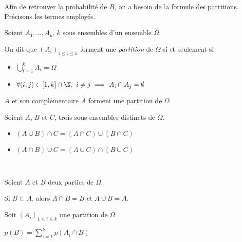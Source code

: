 \documentclass[12pt,a4paper,frenchb]{article}
\begin{document}
Afin de retrouver la probabilité de $B$, on a besoin de la formule des
partitions. Précisons les termes employés.

\begin{definition}
  Soient $A_1,\dots,A_k$, $k$ sous ensembles d'un ensemble $\Omega$.

  On dit que $(A_i)_{1\leq i\leq k}$ forment une \emph{partition} de
  $\Omega$ si et seulement si
  \begin{itemize}
    \item $\bigcup_{i=1}^k A_i = \Omega$
    \item $\forall (i,j) \in [1,k]\cap\N,\  i\neq j \implies A_i\cap
      A_j = \emptyset$
  \end{itemize}
\end{definition}

\begin{remarque} $A$ et son complémentaire $\overline{A}$ forment une
  partition de $\Omega$.
\end{remarque}

\begin{propriete}
  Soient $A$, $B$ et $C$, trois sous ensembles distincts de $\Omega$.

  \begin{itemize}
    \item $(A \cup B) \cap C = (A\cap C) \cup (B\cap C)$
    \item $(A \cap B) \cup C = (A \cup C) \cap (B \cup C)$
  \end{itemize}
\end{propriete}


\begin{remarque}~

  Soient $A$ et $B$ deux parties de $\Omega$.

  Si $B \subset A$, alors $A\cap B = B$ et $A\cup B= A$.
\end{remarque}

\begin{propriete}
  Soit $(A_i)_{1\leq i\leq k}$ une partition de $\Omega$

  $p(B) = \sum_{i=1}^k p(A_i \cap B)$
\end{propriete}
\end{document}
